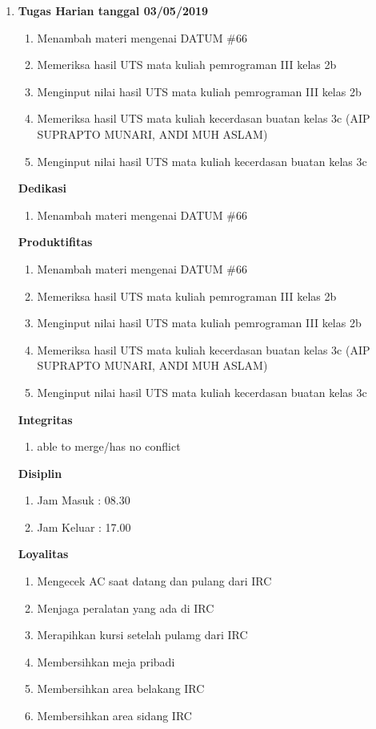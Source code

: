 \begin{enumerate}
\item \textbf{Tugas Harian tanggal 03/05/2019}
\begin{enumerate}
\item Menambah materi mengenai DATUM \#66
\item Memeriksa hasil UTS mata kuliah pemrograman III kelas 2b
\item Menginput nilai hasil UTS mata kuliah pemrograman III kelas 2b
\item Memeriksa hasil UTS mata kuliah kecerdasan buatan kelas 3c (AIP SUPRAPTO MUNARI, ANDI MUH ASLAM)
\item Menginput nilai hasil UTS mata kuliah kecerdasan buatan kelas 3c  
\end{enumerate}

\textbf{Dedikasi}
\begin{enumerate}
\item Menambah materi mengenai DATUM \#66
\end{enumerate}

\textbf{Produktifitas}
\begin{enumerate}
\item Menambah materi mengenai DATUM \#66
\item Memeriksa hasil UTS mata kuliah pemrograman III kelas 2b
\item Menginput nilai hasil UTS mata kuliah pemrograman III kelas 2b
\item Memeriksa hasil UTS mata kuliah kecerdasan buatan kelas 3c (AIP SUPRAPTO MUNARI, ANDI MUH ASLAM)
\item Menginput nilai hasil UTS mata kuliah kecerdasan buatan kelas 3c  
\end{enumerate}

\textbf{Integritas}
\begin{enumerate}
\item able to merge/has no conflict
\end{enumerate}

\textbf{Disiplin}
\begin{enumerate}
\item Jam Masuk : 08.30
\item Jam Keluar : 17.00
\end{enumerate}

\textbf{Loyalitas}
\begin{enumerate}
\item Mengecek AC saat datang dan pulang dari IRC
\item Menjaga peralatan yang ada di IRC
\item Merapihkan kursi setelah pulamg dari IRC
\item Membersihkan meja pribadi
\item Membersihkan area belakang IRC
\item Membersihkan area sidang IRC
\end{enumerate}


\end{enumerate}
